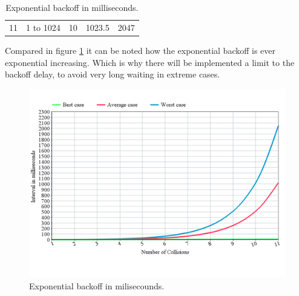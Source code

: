 \begin{table}[ht!]
\begin{tabular}{ l l l l l }
\multicolumn{1}{l}{11}                       & \multicolumn{1}{l}{1 to 1024} & \multicolumn{1}{l}{10} & \multicolumn{1}{l}{1023.5} & 2047       \\ 
\end{tabular}
\caption{Exponential backoff in milliseconds.}
\label{table:expbackoff}
\end{table}

Compared in figure \ref{fig:expbackoff} it can be noted how the exponential backoff is ever exponential increasing.
Which is why there will be implemented a limit to the backoff delay, to avoid very long waiting in extreme cases.

\begin{figure}[H]
\centering
	\includegraphics[width=1.0\textwidth]{figures/backoff.PNG}
	\caption{Exponential backoff in milisecounds.}
	\label{fig:expbackoff}
\end{figure}